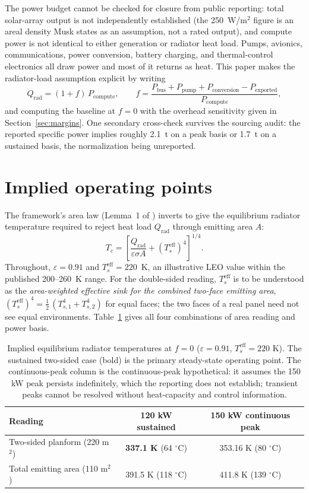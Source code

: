 \documentclass[11pt]{article}
\newcommand{\Tc}{T_c}
\newcommand{\Ts}{T_s^{\mathrm{eff}}}
\newcommand{\eps}{\varepsilon}
\begin{document}
The power budget cannot be checked for closure from public reporting: total solar-array output is not independently established (the 250~W/m$^{2}$ figure is an areal density Musk states as an assumption, not a rated output), and compute power is not identical to either generation or radiator heat load. Pumps, avionics, communications, power conversion, battery charging, and thermal-control electronics all draw power and most of it returns as heat. This paper makes the radiator-load assumption explicit by writing
\begin{equation}
Q_{\mathrm{rad}} = (1+f)\,P_{\mathrm{compute}},
\qquad
f = \frac{P_{\mathrm{bus}}+P_{\mathrm{pump}}+P_{\mathrm{conversion}}-P_{\mathrm{exported}}}{P_{\mathrm{compute}}},
\label{eq:overhead}
\end{equation}
and computing the baseline at $f=0$ with the overhead sensitivity given in Section~\ref{sec:margins}. One secondary cross-check survives the sourcing audit: the reported specific power implies roughly 2.1~t on a peak basis or 1.7~t on a sustained basis, the normalization being unreported.

\section{Implied operating points}\label{sec:implied}

The framework's area law (Lemma~1 of \cite{leeodinson2026}) inverts to give the equilibrium radiator temperature required to reject heat load $Q_{\mathrm{rad}}$ through emitting area $A$:
\begin{equation}
\Tc = \left[\frac{Q_{\mathrm{rad}}}{\eps\sigma A} + (\Ts)^{4}\right]^{1/4}.
\end{equation}
Throughout, $\eps = 0.91$ and $\Ts = 220$~K, an illustrative LEO value within the published 200--260~K range. For the double-sided reading, $\Ts$ is to be understood as the \emph{area-weighted effective sink for the combined two-face emitting area}, $(\Ts)^{4} = \tfrac{1}{2}\,(T_{s,1}^{4}+T_{s,2}^{4})$ for equal faces; the two faces of a real panel need not see equal environments. Table~\ref{tab:operating} gives all four combinations of area reading and power basis.

\begin{table}[h]
\centering
\begin{tabular}{lcc}
\toprule
Reading & 120 kW sustained & 150 kW continuous peak \\
\midrule
Two-sided planform (220 m$^{2}$) & \textbf{337.1 K} (64 $^{\circ}$C) & 353.16 K (80 $^{\circ}$C) \\
Total emitting area (110 m$^{2}$) & 391.5 K (118 $^{\circ}$C) & 411.8 K (139 $^{\circ}$C) \\
\bottomrule
\end{tabular}
\caption{Implied equilibrium radiator temperatures at $f=0$ ($\eps=0.91$, $\Ts=220$ K). The sustained two-sided case (bold) is the primary steady-state operating point. The continuous-peak column is the continuous-peak hypothetical: it assumes the 150 kW peak persists indefinitely, which the reporting does not establish; transient peaks cannot be resolved without heat-capacity and control information.}
\label{tab:operating}
\end{table}
\end{document}
